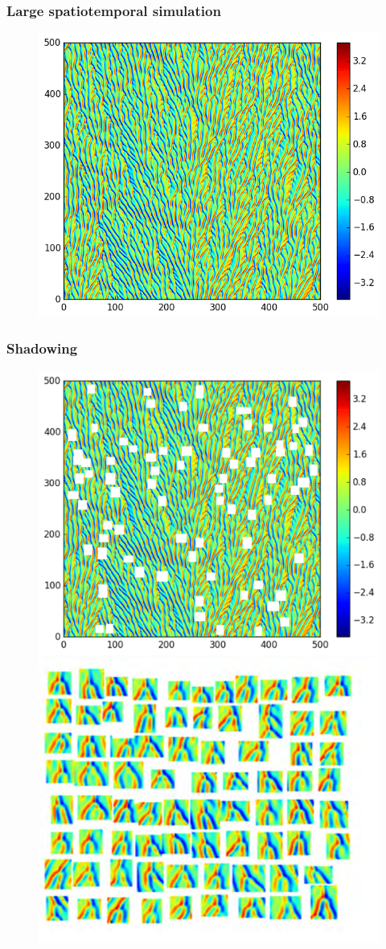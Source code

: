 \documentclass[mathserif, handout]{beamer}
\begin{document}
\begin{frame}
    \frametitle{Large spatiotemporal simulation}
\begin{figure}[h]
\includegraphics[width=.6\textwidth]{MNG_uu500b500}
\end{figure}
\end{frame}

\begin{frame}
    \frametitle{Shadowing}
\begin{figure}[h]
\includegraphics[width=.48\textwidth]{MNG_uu500b500co}
\includegraphics[width=.48\textwidth]{cutouts}
\end{figure}
\end{frame}

\end{document}
